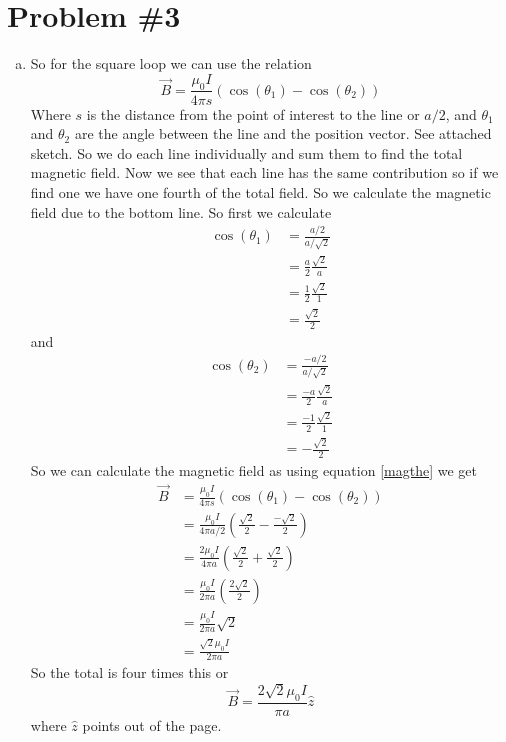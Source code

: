 \documentclass[11pt]{article}
\numberwithin{equation}{section}
\begin{document}
\section{Problem \#3}
\begin{enumerate}[(a)]
\item
So for the square loop we can use the relation 
\begin{equation}
\vec{B} = \frac{\mu_0I}{4\pi s}(\cos(\theta_1)-\cos(\theta_2))
\label{magthe}
\end{equation}
Where $s$ is the distance from the point of interest to the line or $a/2$, and $\theta_1$ and $\theta_2$ are the angle between the line and the position vector. See attached sketch. So we do each line individually and sum them to find the total magnetic field. Now we see that each line has the same contribution so if we find one we have one fourth of the total field. So we calculate the magnetic field due to the bottom line. So first we calculate
\begin{align*}
\cos(\theta_1) &= \frac{a/2}{a/\sqrt{2}}\\
&= \frac{a}{2}\frac{\sqrt{2}}{a}\\
&= \frac{1}{2}\frac{\sqrt{2}}{1}\\
&= \frac{\sqrt{2}}{2}
\end{align*}
and
\begin{align*}
\cos(\theta_2) &= \frac{-a/2}{a/\sqrt{2}}\\
&= \frac{-a}{2}\frac{\sqrt{2}}{a}\\
&= \frac{-1}{2}\frac{\sqrt{2}}{1}\\
&= -\frac{\sqrt{2}}{2}
\end{align*}
So we can calculate the magnetic field as using equation \ref{magthe} we get
\begin{align*}
\vec{B} &= \frac{\mu_0I}{4\pi s}(\cos(\theta_1)-\cos(\theta_2))\\
&= \frac{\mu_0I}{4\pi a/2}\left(\frac{\sqrt{2}}{2}-\frac{-\sqrt{2}}{2}\right)\\
&= \frac{2\mu_0I}{4\pi a}\left(\frac{\sqrt{2}}{2}+\frac{\sqrt{2}}{2}\right)\\
&= \frac{\mu_0I}{2\pi a}\left(\frac{2\sqrt{2}}{2}\right)\\
&= \frac{\mu_0I}{2\pi a}\sqrt{2}\\
&= \frac{\sqrt{2}\mu_0I}{2\pi a}
\end{align*}
So the total is four times this or
$$\vec{B} = \frac{2\sqrt{2}\mu_0I}{\pi a}\hat{z}$$
where $\hat{z}$ points out of the page.


\end{enumerate}
\end{document}
